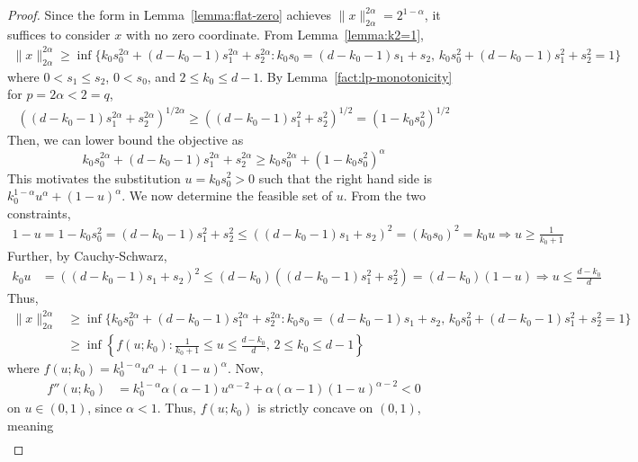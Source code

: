 \documentclass[11pt]{article}
\begin{document}
\begin{proof}
    Since the form in Lemma~\ref{lemma:flat-zero} achieves $\|x\|_{2\alpha}^{2\alpha}=2^{1-\alpha}$, it suffices to consider $x$ with no zero coordinate. From Lemma~\ref{lemma:k2=1}, 
    \begin{align*}
        \|x\|_{2\alpha}^{2\alpha}\geq \inf \{k_0s_0^{2\alpha}+(d-k_0-1)s_1^{2\alpha}+s_2^{2\alpha}:k_0s_0=(d-k_0-1)s_1+s_2,\, k_0s_0^2+(d-k_0-1)s_1^2+s_2^2=1\}
    \end{align*}
    where $0< s_1\leq s_2$, $0< s_0$, and $2\leq k_0\leq d-1$. By Lemma~\ref{fact:lp-monotonicity} for $p=2\alpha<2=q$, 
    \begin{align*}
        \left((d-k_0-1)s_1^{2\alpha}+s_2^{2\alpha}\right)^{1/2\alpha}\geq \left((d-k_0-1)s_1^2+s_2^2\right)^{1/2}=(1-k_0s_0^2)^{1/2}
    \end{align*}
    Then, we can lower bound the objective as
    $$k_0s_0^{2\alpha}+(d-k_0-1)s_1^{2\alpha}+s_2^{2\alpha}\geq k_0s_0^{2\alpha}+(1-k_0s_0^2)^{\alpha}$$
    This motivates the substitution $u=k_0s_0^2> 0$ such that the right hand side is $k_0^{1-\alpha}u^{\alpha}+(1-u)^{\alpha}$. We now determine the feasible set of $u$. From the two constraints,
    \begin{align*}
        1-u=1-k_0s_0^2=(d-k_0-1)s_1^2+s_2^2\leq ((d-k_0-1)s_1+s_2)^2=(k_0s_0)^2=k_0u\Rightarrow u\geq \frac{1}{k_0+1}
    \end{align*}
    Further, by Cauchy-Schwarz,
    \begin{align*}
        k_0u&=((d-k_0-1)s_1+s_2)^2\leq (d-k_0)((d-k_0-1)s_1^2+s_2^2)=(d-k_0)(1-u)\Rightarrow u\leq \frac{d-k_0}{d}
    \end{align*}
    Thus, 
    \begin{align*}
         \|x\|_{2\alpha}^{2\alpha}&\geq \inf \{k_0s_0^{2\alpha}+(d-k_0-1)s_1^{2\alpha}+s_2^{2\alpha}:k_0s_0=(d-k_0-1)s_1+s_2,\, k_0s_0^2+(d-k_0-1)s_1^2+s_2^2=1\}\\
         &\geq \inf \left\{f(u;k_0):\frac{1}{k_0+1}\leq u\leq \frac{d-k_0}{d},\,2\leq k_0\leq d-1\right\}
    \end{align*}
    where $f(u;k_0)=k_0^{1-\alpha}u^\alpha+(1-u)^{\alpha}$. Now, 
    \begin{align*}
        f''(u;k_0)&= k_0^{1-\alpha}\alpha(\alpha-1)u^{\alpha-2}+\alpha(\alpha-1)(1-u)^{\alpha-2}<0
    \end{align*}
    on $u\in (0,1)$, since $\alpha < 1$. Thus, $f(u;k_0)$ is strictly concave on $(0,1)$, meaning
    \begin{align*}   

\end{align*}
\end{proof}
\end{document}
